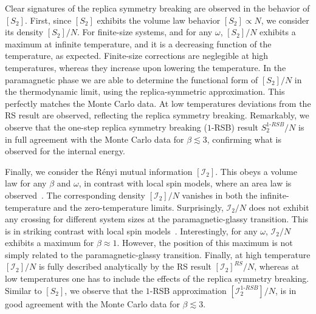 \documentclass[twocolumn,superscriptaddress,prb,10pt]{revtex4-1}
\begin{document}
Clear signatures of the replica symmetry breaking are observed in the behavior of $[S_2]$. 
First, since $[S_2]$ exhibits the volume law behavior $[S_2]\propto N$, 
we consider its density $[S_2]/N$. For finite-size systems, and for any $\omega$, $[S_2]/N$ 
exhibits a maximum at infinite temperature, and it is a decreasing function of the temperature, 
as expected. Finite-size corrections are neglegible at high temperatures, whereas they increase 
upon lowering the temperature. In the paramagnetic phase we are able to determine the functional 
form of $[S_2]/N$ in the thermodynamic limit, using the replica-symmetric approximation. This 
perfectly matches the Monte Carlo data. At low temperatures deviations from the RS result are 
observed, reflecting the replica symmetry breaking. Remarkably, we observe that the one-step 
replica symmetry breaking ($1$-RSB) result $S_2^{1\textrm{-}RSB}/N$ is in full agreement with 
the Monte Carlo data for $\beta\lesssim 3$, confirming what is observed for the internal 
energy. 

Finally, we consider the R\'enyi mutual information $[{\mathcal I}_2]$. This obeys a volume 
law for any $\beta$ and $\omega$, in contrast with local spin models, where an area law is 
observed~\cite{wolf-2008}. The corresponding density $[{\mathcal I}_2]/N$ vanishes in 
both the infinite-temperature and the zero-temperature limits. Surprisingly, ${\mathcal I}_2/N$ 
does not exhibit any crossing for different system sizes at the paramagnetic-glassy transition.
This is in striking contrast with local spin models~\cite{jaconis-2013}. Interestingly, for 
any $\omega$, ${\mathcal I}_2/N$ exhibits a maximum for $\beta\approx 1$. However, the 
position of this maximum is not simply related to the paramagnetic-glassy transition. Finally, 
at high temperature $[{\mathcal I}_2]/N$ is fully described analytically by the RS result 
$[{\mathcal I}_2]^{RS}/N$, whereas at low temperatures one has to include the effects of the 
replica symmetry breaking. Similar to $[S_2]$, we observe that the $1$-RSB approximation 
$[{\mathcal I}^{1\textrm{-}RSB}_2]/N$, is in good agreement with the Monte Carlo data 
for $\beta\lesssim 3$.
\end{document}
